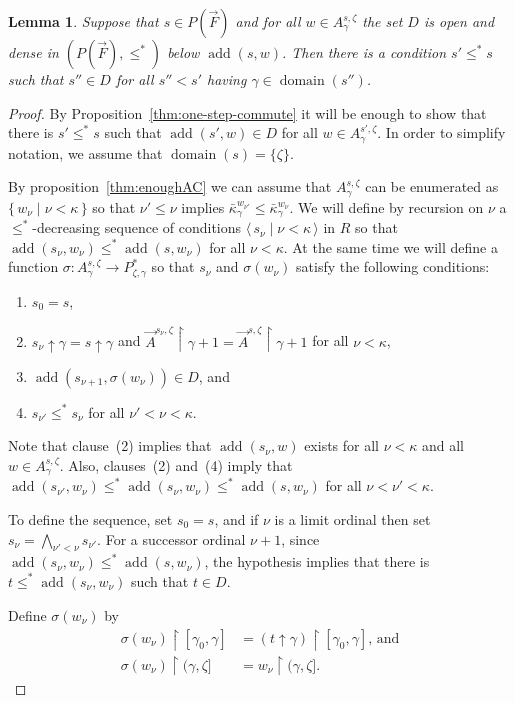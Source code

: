 \documentclass[
twoside,
]{article}
\newtheorem{lemma}[theorem]{Lemma}
\theoremstyle{definition}
\theoremstyle{remark}
\newcommand{\forceKappa}{\bar\kappa} %
\DeclareMathOperator{\add}{add}
\newcommand{\scutdown}{{\uparrow}}
\newcommand{\sing}[1]{\{#1\}}
\newcommand{\set}[1]{\{\,#1\,\}}
\newcommand{\pair}[1]{\langle#1\rangle}
\newcommand{\seq}[1]{\pair{\,#1\,}}
\newcommand{\restrict}{{\upharpoonright}}
\DeclareMathOperator{\domain}{domain}
\begin{document}
\begin{lemma}
  \label{thm:diagonal-closure}
  Suppose that $s\in P(\vec F)$ and for all $w\in
  A^{s,\zeta}_{\gamma}$ the set $D$ is open and dense  in
  $(P(\vec F),\leq^*)$ below $\add(s,w)$.   Then there is  a condition
  $s'\leq^* s$ such that   $s''\in D$ for all $s''<s'$ having $\gamma\in\domain(s'')$.
\end{lemma}
\begin{proof}{}
  By Proposition~\ref{thm:one-step-commute} it will be enough to show
  that there is $s'\leq^* s$ such that $\add(s',w)\in D$ for all
  $w\in A^{s',\zeta}_{\gamma}$.   In order to simplify notation,
  we assume that $\domain(s)=\sing{\zeta}$. 


  By proposition~\ref{thm:enoughAC} we can assume that
  $A^{s,\zeta}_{\gamma}$ can be enumerated as $\set{w_{\nu}\mid
    \nu<\kappa}$  
  so that $\nu'\leq\nu$ implies
  $\forceKappa^{w_{\nu'}}_{\gamma}\leq\forceKappa^{w_{\nu}}_{\gamma}$.
  We will define  by recursion on $\nu$ a 
  $\leq^*$-decreasing sequence of conditions
  $\seq{s_{\nu}\mid\nu<\kappa}$ in $R$ so that
  $\add(s_{\nu},w_\nu)\leq^* \add(s,w_\nu)$ for all $\nu<\kappa$.
  At the same time we will define a function $\sigma\colon
  A^{s,\zeta}_{\gamma}\to P^{*}_{\zeta,\gamma}$ so that $s_\nu$ and
  $\sigma(w_\nu)$ satisfy the following conditions:
  \begin{enumerate}
  \item $s_0=s$,
  \item $s_{\nu}\scutdown\gamma=s\scutdown\gamma$ and $\vec
    A^{s_\nu,\zeta}\restrict\gamma+1=\vec
    A^{s,\zeta}\restrict\gamma+1$ for all $\nu<\kappa$, 
  \item $\add(s_{\nu+1},\sigma(w_\nu))\in D$, and 
  \item $s_{\nu'}\leq^*s_{\nu}$ for all $\nu'<\nu<\kappa$.
  \end{enumerate}
  Note that clause~(2) implies that $\add(s_{\nu},w)$ exists for all
  $\nu<\kappa$ and all $w\in A^{s,\zeta}_{\gamma}$.   Also,  clauses~(2)
  and~(4) imply that $\add(s_{\nu'},w_{\nu})\le^*
  \add(s_{\nu},w_\nu)\leq^* \add(s,w_\nu)$ for all $\nu<\nu'<\kappa$.
  
  To define the sequence, set $s_0=s$, and 
  if $\nu$ is a limit ordinal then set
  $s_{\nu}=\bigwedge_{\nu'<\nu}s_{\nu'}$.  For a successor ordinal
  $\nu+1$, since $\add(s_{\nu},w_\nu)\leq^* \add(s,w_\nu)$, the
  hypothesis implies that there is $t\leq^*\add(s_\nu,w_\nu)$ such
  that $t\in D$.

  Define $\sigma(w_\nu)$ by
  \begin{align*}
    \sigma(w_\nu)\restrict[\gamma_0,\gamma] &=
                                              (t\scutdown\gamma)\restrict[\gamma_0,\gamma]
    \text{, and}\\
    \sigma(w_\nu)\restrict(\gamma,\zeta] &=
                                           w_\nu\restrict(\gamma,\zeta].
  \end{align*}
  

\end{proof}
\end{document}

